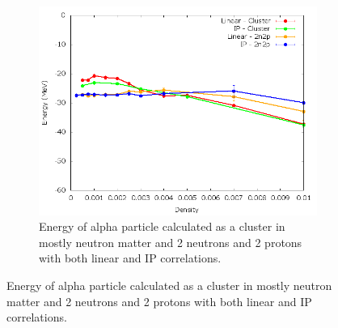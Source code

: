 \documentclass[12pt]{article}
\begin{document}
\begin{figure}[h!]
\begin{subfigure}{0.49\textwidth}
   \end{subfigure}
   ~
   \begin{subfigure}{0.49\textwidth}
      \includegraphics[width=\textwidth]{../alpha_and_2n2p.png}
      \caption{Energy of alpha particle calculated as a cluster in mostly neutron matter and 2 neutrons and 2 protons with both linear and IP correlations.}
   \end{subfigure}
\end{figure}


\clearpage


\end{document}
